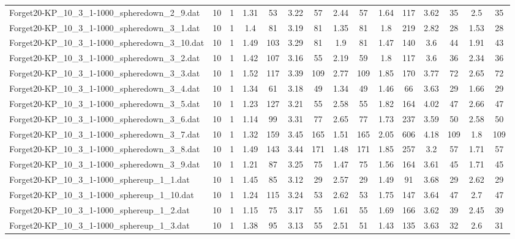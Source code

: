 \begin{table}[!ht]
{\begin{tabular}{lcccccccccccccc}
Forget20-KP\_10\_3\_1-1000\_spheredown\_2\_9.dat & 10 & 1 & 1.31 & 53 & 3.22 & 57 & 2.44 & 57 & 1.64 & 117 & 3.62 & 35 & 2.5 & 35 \\
Forget20-KP\_10\_3\_1-1000\_spheredown\_3\_1.dat & 10 & 1 & 1.4 & 81 & 3.19 & 81 & 1.35 & 81 & 1.8 & 219 & 2.82 & 28 & 1.53 & 28 \\
Forget20-KP\_10\_3\_1-1000\_spheredown\_3\_10.dat & 10 & 1 & 1.49 & 103 & 3.29 & 81 & 1.9 & 81 & 1.47 & 140 & 3.6 & 44 & 1.91 & 43 \\
Forget20-KP\_10\_3\_1-1000\_spheredown\_3\_2.dat & 10 & 1 & 1.42 & 107 & 3.16 & 55 & 2.19 & 59 & 1.8 & 117 & 3.6 & 36 & 2.34 & 36 \\
Forget20-KP\_10\_3\_1-1000\_spheredown\_3\_3.dat & 10 & 1 & 1.52 & 117 & 3.39 & 109 & 2.77 & 109 & 1.85 & 170 & 3.77 & 72 & 2.65 & 72 \\
Forget20-KP\_10\_3\_1-1000\_spheredown\_3\_4.dat & 10 & 1 & 1.34 & 61 & 3.18 & 49 & 1.34 & 49 & 1.46 & 66 & 3.63 & 29 & 1.66 & 29 \\
Forget20-KP\_10\_3\_1-1000\_spheredown\_3\_5.dat & 10 & 1 & 1.23 & 127 & 3.21 & 55 & 2.58 & 55 & 1.82 & 164 & 4.02 & 47 & 2.66 & 47 \\
Forget20-KP\_10\_3\_1-1000\_spheredown\_3\_6.dat & 10 & 1 & 1.14 & 99 & 3.31 & 77 & 2.65 & 77 & 1.73 & 237 & 3.59 & 50 & 2.58 & 50 \\
Forget20-KP\_10\_3\_1-1000\_spheredown\_3\_7.dat & 10 & 1 & 1.32 & 159 & 3.45 & 165 & 1.51 & 165 & 2.05 & 606 & 4.18 & 109 & 1.8 & 109 \\
Forget20-KP\_10\_3\_1-1000\_spheredown\_3\_8.dat & 10 & 1 & 1.49 & 143 & 3.44 & 171 & 1.48 & 171 & 1.85 & 257 & 3.2 & 57 & 1.71 & 57 \\
Forget20-KP\_10\_3\_1-1000\_spheredown\_3\_9.dat & 10 & 1 & 1.21 & 87 & 3.25 & 75 & 1.47 & 75 & 1.56 & 164 & 3.61 & 45 & 1.71 & 45 \\
Forget20-KP\_10\_3\_1-1000\_sphereup\_1\_1.dat & 10 & 1 & 1.45 & 85 & 3.12 & 29 & 2.57 & 29 & 1.49 & 91 & 3.68 & 29 & 2.62 & 29 \\
Forget20-KP\_10\_3\_1-1000\_sphereup\_1\_10.dat & 10 & 1 & 1.24 & 115 & 3.24 & 53 & 2.62 & 53 & 1.75 & 147 & 3.64 & 47 & 2.7 & 47 \\
Forget20-KP\_10\_3\_1-1000\_sphereup\_1\_2.dat & 10 & 1 & 1.15 & 75 & 3.17 & 55 & 1.61 & 55 & 1.69 & 166 & 3.62 & 39 & 2.45 & 39 \\
Forget20-KP\_10\_3\_1-1000\_sphereup\_1\_3.dat & 10 & 1 & 1.38 & 95 & 3.13 & 55 & 2.51 & 51 & 1.43 & 135 & 3.63 & 32 & 2.6 & 31 \\

\end{tabular}}
\end{table}
